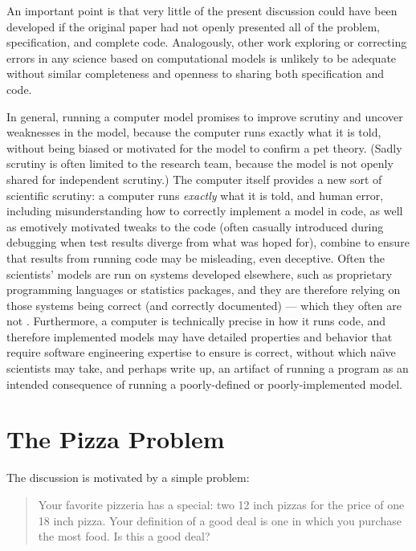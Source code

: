 \documentclass[11pt]{article}
\begin{document}
An important point is that very little of the present discussion could have been developed if the original paper \cite{pizzap} had not openly presented all of the problem, specification, and complete code. Analogously, other work exploring or correcting errors in any science based on computational models is unlikely to be adequate without similar completeness and openness to sharing both specification and code. 

In general, running a computer model promises to improve scrutiny and uncover weaknesses in the model, because the computer runs exactly what it is told, without being biased or motivated for the model to confirm a pet theory. (Sadly scrutiny is often limited to the research team, because the model is not openly shared for independent scrutiny.) The computer itself provides a new sort of scientific scrutiny: a computer runs \emph{exactly\/} what it is told, and human error, including misunderstanding how to correctly implement a model in code, as well as emotively motivated tweaks to the code (often casually introduced during debugging when test results diverge from what was hoped for), combine to ensure that results from running code may be misleading, even deceptive. Often the scientists' models are run on systems developed elsewhere, such as proprietary programming languages or statistics packages, and they are therefore relying on those systems being correct (and correctly documented) --- which they often are not \cite{heedless}. Furthermore, a computer is technically precise in how it runs code, and therefore implemented models may have detailed properties and behavior that require software engineering expertise to ensure is correct, without which na\" \i ve scientists may take, and perhaps write up, an artifact of running a program as an intended consequence of running a poorly-defined or poorly-implemented model.

\section{The Pizza Problem}
The discussion is motivated by a simple problem:

\def\orderA{{\sf\bfseries a}}
\def\orderB{{\sf\bfseries b}}

\begin{quote}\sf
Your favorite pizzeria has a special: two 12 inch pizzas for the price of one 18 inch pizza. Your definition of a good deal is one in which you purchase the most food. Is this a good deal?  \cite{pizzap}
\end{quote}
\end{document}
